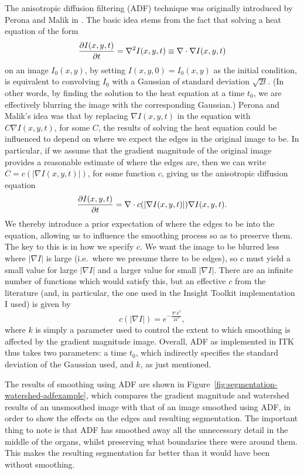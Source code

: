 The anisotropic diffusion filtering (ADF) technique was originally introduced by Perona and Malik in \cite{perona90}. The basic idea stems from the fact that solving a heat equation of the form
%
\[
\frac{\partial I(x,y,t)}{\partial t} = \nabla^2 I(x,y,t) \equiv \nabla \cdot \nabla I(x,y,t)
\]
%
on an image $I_0(x,y)$, by setting $I(x,y,0) = I_0(x,y)$ as the initial condition, is equivalent to convolving $I_0$ with a Gaussian of standard deviation $\sqrt{2t}$. (In other words, by finding the solution to the heat equation at a time $t_0$, we are effectively blurring the image with the corresponding Gaussian.) Perona and Malik's idea was that by replacing $\nabla I(x,y,t)$ in the equation with $C \nabla I(x,y,t)$, for some $C$, the results of solving the heat equation could be influenced to depend on where we expect the edges in the original image to be. In particular, if we assume that the gradient magnitude of the original image provides a reasonable estimate of where the edges are, then we can write $C = c(|\nabla I(x,y,t)|)$, for some function $c$, giving us the anisotropic diffusion equation
%
\[
\frac{\partial I(x,y,t)}{\partial t} = \nabla \cdot c(|\nabla I(x,y,t)|) \nabla I(x,y,t).
\]
%
We thereby introduce a prior expectation of where the edges to be into the equation, allowing us to influence the smoothing process so as to preserve them. The key to this is in how we specify $c$. We want the image to be blurred less where $|\nabla I|$ is large (i.e.~where we presume there to be edges), so $c$ must yield a small value for large $|\nabla I|$ and a larger value for small $|\nabla I|$. There are an infinite number of functions which would satisfy this, but an effective $c$ from the literature (and, in particular, the one used in the Insight Toolkit \cite{itk} implementation I used) is given by
%
\[
c(|\nabla I|) = e^{-\frac{|\nabla I|^2}{2k^2}},
\]
%
where $k$ is simply a parameter used to control the extent to which smoothing is affected by the gradient magnitude image. Overall, ADF as implemented in ITK thus takes two parameters: a time $t_0$, which indirectly specifies the standard deviation of the Gaussian used, and $k$, as just mentioned.

The results of smoothing using ADF are shown in Figure~\ref{fig:segmentation-watershed-adfexample}, which compares the gradient magnitude and watershed results of an unsmoothed image with that of an image smoothed using ADF, in order to show the effects on the edges and resulting segmentation. The important thing to note is that ADF has smoothed away all the unnecessary detail in the middle of the organs, whilst preserving what boundaries there were around them. This makes the resulting segmentation far better than it would have been without smoothing.

